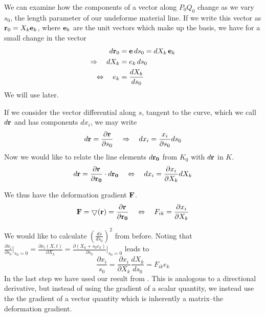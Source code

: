 We can examine how the components of a vector along $P_0Q_0$ change as we vary $s_0$, the length parameter of our undeforme material line.  
If we write this vector as ${\bf{r}}_0= X_k{\bf{e}}_k$, where ${\bf{e}}_k$ are the 
unit vectors which make up the basis, we have for a small change in the vector
\begin{equation}
\label{eq:dXkds0}
  \begin{split}
    d{\bf{r}}_0 &= {\bf{e}}\,ds_0=dX_k\,{\bf{e}}_k \\ 
    \Rightarrow \quad dX_k &= e_k\,ds_0 \\ 
    \Leftrightarrow \quad e_k &= \frac{dX_k}{ds_0}
  \end{split}
\end{equation}
We will use  later.

If we consider the vector differential along $s$, tangent to the curve, which we call $d{\bf{r}}$ and has components $dx_i$, we may write
\begin{equation}
\label{eq:drds0}
d{\bf{r}}=\frac{\partial{\bf{r}}}{\partial s_0} \quad \Rightarrow \quad dx_i=\frac{x_i}{\partial{s_0}}ds_0
\end{equation}
Now we would like to relate the line elements $d{\bf{r_0}}$ from $K_0$ with $d{\bf{r}}$ in $K$.
\begin{equation}
\label{eq:drd0}
d{\bf{r}}=\frac{\partial{\bf{r}}}{\partial {\bf{r}_0}} \cdot d{\bf{r}_0} \quad  \Leftrightarrow \quad dx_i=\frac{\partial x_i}{\partial X_k}dX_k
\end{equation}

We thus have the deformation gradient ${\bf{F}}$.
\begin{equation}
 \label{eq:defGrad}
 {\bf{F}}=\bigtriangledown({\bf{r}})=\frac{\partial{\bf{r}}}{\partial{\bf{r}_0}} \quad \Leftrightarrow  \quad F_{ik}=\frac{\partial x_i}{\partial X_k}
\end{equation}


We would like to calculate $(\frac{ds}{ds_0})^2$ from before.  
Noting that 
$ 
 \frac{\partial x_i}{\partial s_0}\bigg|_{s_0=0}
 =\frac{\partial x_i(X,t)}{\partial X_k}
 =\frac{\partial (X_k+s_0e_k)}{\partial s_0}\bigg|_{s_0=0}
$ leads to 
\begin{equation}
 \frac{\partial x_i}{s_0}=
 \frac{\partial x_i}{\partial X_k}\frac{dX_k}{ds_0}=F_{ik}e_k
\end{equation}
In the last step we have used our result from .  
This is analogous to a directional derivative, but instead of using
the gradient of a scalar quantity, we instead use the the gradient of a vector quantity which is inherently a matrix--the deformation gradient.

